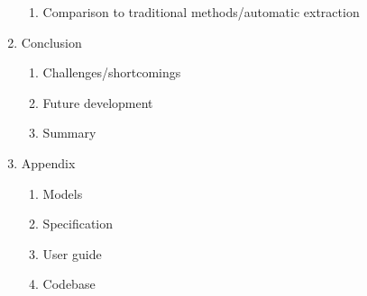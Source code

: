 \begin{enumerate}
\begin{enumerate}
		\item Comparison to traditional methods/automatic extraction
	\end{enumerate}
	\item Conclusion
	\begin{enumerate}
		\item Challenges/shortcomings
		\item Future development
		\item Summary
	\end{enumerate}
	\item Appendix
	\begin{enumerate}
		\item Models
		\item Specification
		\item User guide
		\item Codebase
	\end{enumerate}
\end{enumerate}